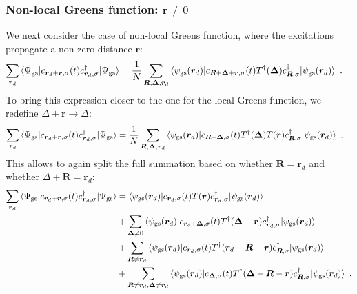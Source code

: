 \subsubsection*{Non-local Greens function: \(\bm r \neq 0\)}
We next consider the case of non-local Greens function, where the excitations propagate a non-zero distance \(\bm r\):
\begin{equation}\begin{aligned}
	\sum_{\bm r_d}\braket{\Psi_\text{gs} | c_{{\bm r_d + \bm r},\sigma}(t) c^\dagger_{{\bm r_d},\sigma} | \Psi_\text{gs}} &=\frac{1}{N}\sum_{\bm R,\bm \Delta,\bm r_d} \braket{\psi_\text{gs}({\bm r_d}) |  c_{{\bm R + \bm \Delta + \bm r},\sigma}(t) T^\dagger({\bm \Delta}) c^\dagger_{{\bm R},\sigma} | \psi_\text{gs}({\bm r_d})}~.
\end{aligned}\end{equation}
To bring this expression closer to the one for the local Greens function, we redefine \(\Delta + \bm r \to \Delta\):
\begin{equation}\begin{aligned}
	\sum_{\bm r_d}\braket{\Psi_\text{gs} | c_{{\bm r_d + \bm r},\sigma}(t) c^\dagger_{{\bm r_d},\sigma} | \Psi_\text{gs}} &=\frac{1}{N}\sum_{\bm R,\bm \Delta,\bm r_d} \braket{\psi_\text{gs}({\bm r_d}) |  c_{{\bm R + \bm \Delta},\sigma}(t) T^\dagger({\bm \Delta}) T(\bm r) c^\dagger_{{\bm R},\sigma} | \psi_\text{gs}({\bm r_d})}~.
\end{aligned}\end{equation}
This allows to again split the full summation based on whether \(\bm R = \bm r_d\) and whether \(\Delta + \bm R = \bm r_d\):
\begin{equation}\begin{aligned}\label{NLrealGreenSplit}
	\sum_{\bm r_d}\braket{\Psi_\text{gs} | c_{{\bm r_d + \bm r},\sigma}(t) c^\dagger_{{\bm r_d},\sigma} | \Psi_\text{gs}} &= \braket{\psi_\text{gs}({\bm r_d}) |  c_{{\bm r_d},\sigma}(t) T(\bm r) c^\dagger_{{\bm r_d},\sigma} | \psi_\text{gs}({\bm r_d})}\\
																												  &+ \sum_{\bm \Delta \neq 0}\braket{\psi_\text{gs}({\bm r_d}) |  c_{{\bm r_d + \bm \Delta},\sigma}(t) T^\dagger({\bm \Delta - \bm r}) c^\dagger_{{\bm r_d},\sigma} | \psi_\text{gs}({\bm r_d})}\\
																											&+\sum_{\bm R \neq \bm r_d}\braket{\psi_\text{gs}({\bm r_d}) |  c_{{\bm r_d},\sigma}(t) T^\dagger({\bm r_d - \bm R - \bm r}) c^\dagger_{{\bm R},\sigma} | \psi_\text{gs}({\bm r_d})}\\
																											&+\sum_{\bm R \neq \bm r_d, \bm \Delta \neq \bm r_d}\braket{\psi_\text{gs}({\bm r_d}) |  c_{{\bm \Delta},\sigma}(t) T^\dagger({\bm \Delta - \bm R - \bm r}) c^\dagger_{{\bm R},\sigma} | \psi_\text{gs}({\bm r_d})}~.
\end{aligned}\end{equation}
